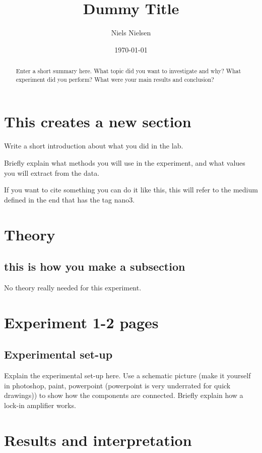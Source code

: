 \documentclass[a4paper]{article}
\title{Dummy Title}
\author{Niels Nielsen}
\date{\today}
\begin{document}
\maketitle

\begin{abstract}
Enter a short summary here. What topic did you want to investigate and why? What experiment did you perform? What were your main results and conclusion?
\end{abstract}

\section{This creates a new section}
\label{sec:introduction}

Write a short introduction about what you did in the lab.

Briefly explain what methods you will use in the experiment, and what values you will extract from the data.

If you want to cite something you can do it like this\cite{nano3}, this will refer to the medium defined in the end that has the tag nano3.

\section{Theory}
\label{sec:theory}

\subsection{this is how you make a subsection}
No theory really needed for this experiment.

\section{Experiment 1-2 pages}

\subsection{Experimental set-up}
Explain the experimental set-up here. Use a schematic picture (make it yourself in photoshop, paint, powerpoint (powerpoint is very underrated for quick drawings)) to show how the components are connected. Briefly explain how a lock-in amplifier works.

\section{Results and interpretation}
\end{document}
